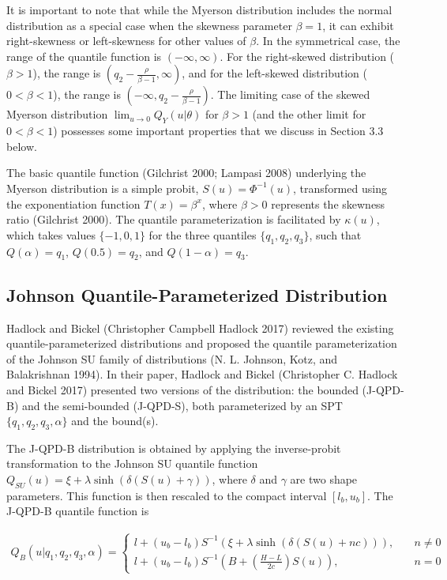 \documentclass[
]{interact}
\begin{document}
It is important to note that while the Myerson distribution includes the
normal distribution as a special case when the skewness parameter
\(\beta = 1\), it can exhibit right-skewness or left-skewness for other
values of \(\beta\). In the symmetrical case, the range of the quantile
function is \((-\infty, \infty)\). For the right-skewed distribution
(\(\beta > 1\)), the range is
\((q_2 - \frac{\rho}{\beta - 1}, \infty)\), and for the left-skewed
distribution (\(0 < \beta < 1\)), the range is
\((-\infty, q_2 - \frac{\rho}{\beta - 1})\). The limiting case of the
skewed Myerson distribution \(\lim_{u \rightarrow 0} Q_Y(u\vert\theta)\)
for \(\beta > 1\) (and the other limit for \(0 < \beta < 1\)) possesses
some important properties that we discuss in Section 3.3 below.

The basic quantile function (Gilchrist 2000; Lampasi 2008) underlying
the Myerson distribution is a simple probit, \(S(u) = \Phi^{-1}(u)\),
transformed using the exponentiation function \(T(x) = \beta^{x}\),
where \(\beta > 0\) represents the skewness ratio (Gilchrist 2000). The
quantile parameterization is facilitated by \(\kappa(u)\), which takes
values \(\{-1,0,1\}\) for the three quantiles \(\{q_1, q_2, q_3\}\),
such that \(Q(\alpha) = q_1\), \(Q(0.5) = q_2\), and
\(Q(1 - \alpha) = q_3\).

\subsection{Johnson Quantile-Parameterized
Distribution}\label{johnson-quantile-parameterized-distribution}

Hadlock and Bickel (Christopher Campbell Hadlock 2017) reviewed the
existing quantile-parameterized distributions and proposed the quantile
parameterization of the Johnson SU family of distributions (N. L.
Johnson, Kotz, and Balakrishnan 1994). In their paper, Hadlock and
Bickel (Christopher C. Hadlock and Bickel 2017) presented two versions
of the distribution: the bounded (J-QPD-B) and the semi-bounded
(J-QPD-S), both parameterized by an SPT \(\{q_1, q_2, q_3, \alpha\}\)
and the bound(s).

The J-QPD-B distribution is obtained by applying the inverse-probit
transformation to the Johnson SU quantile function
\(Q_{SU}(u) = \xi + \lambda\sinh(\delta(S(u) + \gamma))\), where
\(\delta\) and \(\gamma\) are two shape parameters. This function is
then rescaled to the compact interval \([l_b, u_b]\). The J-QPD-B
quantile function is

\[
\begin{gathered}
Q_B(u\vert q_1, q_2, q_3, \alpha)=
\begin{cases}
l+(u_b-l_b)S^{-1}(\xi+\lambda\sinh(\delta(S(u)+nc))), \quad &n\neq0\\
l+(u_b-l_b)S^{-1}\left(B+\left(\frac{H-L}{2c}\right)S(u)\right), \quad &n=0
\end{cases}
\end{gathered}
\]
\end{document}
